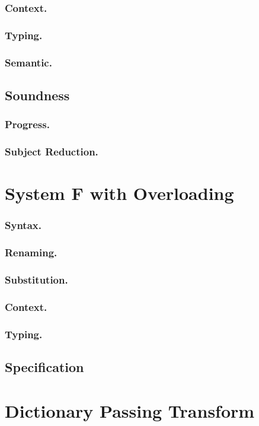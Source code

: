 \documentclass[runningheads]{llncs}
\begin{document}
\subsubsection{Context.}
\subsubsection{Typing.}
\subsubsection{Semantic.}
\subsection{Soundness}
\subsubsection{Progress.}
\subsubsection{Subject Reduction.}
\section{System F with Overloading}
\subsubsection{Syntax.} 
\subsubsection{Renaming.}
\subsubsection{Substitution.}
\subsubsection{Context.}
\subsubsection{Typing.}
\subsection{Specification}
\section{Dictionary Passing Transform}
\end{document}
